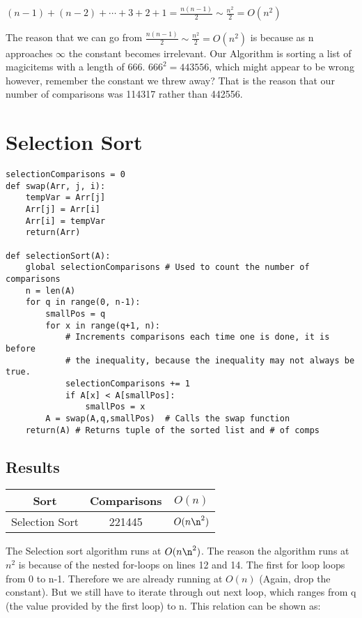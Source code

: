 \documentclass{article}
\begin{document}
$(n-1) + (n-2) + \cdots + 3 + 2 + 1 = \frac{n(n-1)}{2} \sim \frac{n^2}{2} = O(n^2)$
\vspace{2mm}

The reason that we can go from  $\frac{n(n-1)}{2} \sim \frac{n^2}{2} = O(n^2)$
\vspace{1mm}
is because as n approaches $\infty$  the constant becomes irrelevant.
Our Algorithm is sorting a list of magicitems with a length of 666. $666^2 = 443556$, which might appear to be wrong however, remember the constant we threw away? That is the reason that our number of comparisons was 114317 rather than 442556.

\newpage

\section{Selection Sort}
\label{Selection Sort}
\begin{lstlisting}
selectionComparisons = 0
def swap(Arr, j, i):
    tempVar = Arr[j]
    Arr[j] = Arr[i]
    Arr[i] = tempVar
    return(Arr)

def selectionSort(A):
    global selectionComparisons # Used to count the number of comparisons
    n = len(A)
    for q in range(0, n-1):
        smallPos = q
        for x in range(q+1, n):
            # Increments comparisons each time one is done, it is before 
            # the inequality, because the inequality may not always be true.
            selectionComparisons += 1
            if A[x] < A[smallPos]:
                smallPos = x
        A = swap(A,q,smallPos)  # Calls the swap function
    return(A) # Returns tuple of the sorted list and # of comps

\end{lstlisting}
\subsection{Results}
\begin{tabular}{c|c|c}
    Sort & Comparisons & $O(n)$ \\
\hline
    Selection Sort & 221445 & $O(n\n^2)$
\end{tabular}
\vspace{5mm}

The Selection sort algorithm runs at $O(n\n^2)$. The reason the algorithm runs at $n^2$ is because of the nested for-loops on lines 12 and 14. The first for loop loops from 0 to n-1. Therefore we are already running at $O(n)$ (Again, drop the constant). But we still have to iterate through out next loop, which ranges from q (the value provided by the first loop) to n. This relation can be shown as:
\vspace{2mm}
\end{document}
